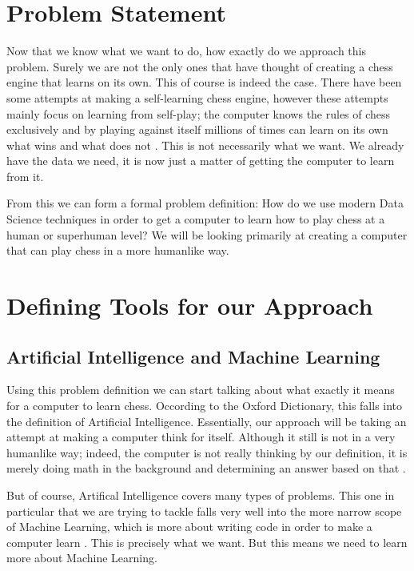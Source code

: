 \documentclass[12pt]{article}
\begin{document}
    \section{Problem Statement}

    Now that we know what we want to do, how exactly do we approach this problem. Surely we are not the only ones that have thought of creating a chess engine that learns on its own. This of course is indeed the case. There have been some attempts at making a self-learning chess engine, however these attempts mainly focus on learning from self-play; the computer knows the rules of chess exclusively and by playing against itself millions of times can learn on its own what wins and what does not \cite{leelachess}\cite{alphazero}. This is not necessarily what we want. We already have the data we need, it is now just a matter of getting the computer to learn from it.

    From this we can form a formal problem definition: How do we use modern Data Science techniques in order to get a computer to learn how to play chess at a human or superhuman level? We will be looking primarily at creating a computer that can play chess in a more humanlike way. 
    
    \section{Defining Tools for our Approach}

    \subsection{Artificial Intelligence and Machine Learning}

    Using this problem definition we can start talking about what exactly it means for a computer to learn chess. Occording to the Oxford Dictionary, this falls into the definition of Artificial Intelligence. Essentially, our approach will be taking an attempt at making a computer think for itself. Although it still is not in a very humanlike way; indeed, the computer is not really thinking by our definition, it is merely doing math in the background and determining an answer based on that \cite{mltypes_book}. 

    But of course, Artifical Intelligence covers many types of problems. This one in particular that we are trying to tackle falls very well into the more narrow scope of Machine Learning, which is more about writing code in order to make a computer learn \cite{mlprojects_netdevs}. This is precisely what we want. But this means we need to learn more about Machine Learning. 
\end{document}

